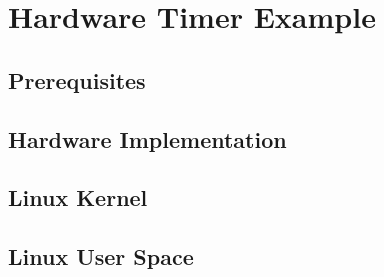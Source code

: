 \section{Hardware Timer Example}

\subsection{Prerequisites}

\subsection{Hardware Implementation}


\subsection{Linux Kernel}\label{kernel}


\subsection{Linux User Space}
